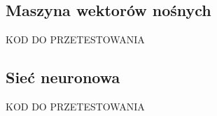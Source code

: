 \subsection{Maszyna wektorów nośnych}

KOD DO PRZETESTOWANIA


\subsection{Sieć neuronowa}

KOD DO PRZETESTOWANIA

